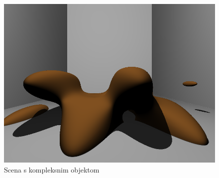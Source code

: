 \documentclass[a4paper,12pt]{article}
\begin{document}
\begin{figure}[h]
  \centering
  \includegraphics[width=\textwidth]{screen6.png}
  \caption{Scena s kompleksnim objektom}
  \label{fig:complex}
\end{figure}
\end{document}
